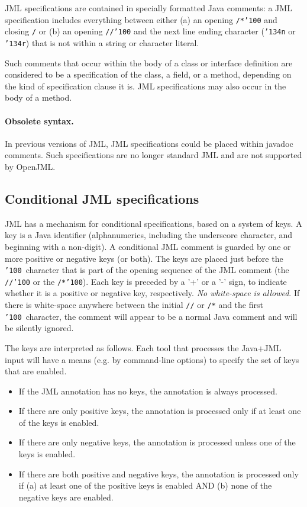 \documentclass{report}%
\newcommand{\bs}{{\tt \char'134}}
\newcommand{\at}{{\tt \char'100}}
\begin{document}
JML specifications are contained in specially formatted Java comments:
a JML specification includes everything between either (a) an opening {\tt /*\at} and closing {\tt */}
or (b) an opening {\tt //\at} and the next line ending character ({\tt \bs n}
or {\tt \bs r}) that is not within a string or character literal.

Such comments that occur within the body of a class or interface definition are
considered to be a specification of the class, a field, or a method, depending on the
kind of specification clause it is. JML specifications may also occur in the body of 
a method.

\paragraph{Obsolete syntax.} In previous versions of JML, JML specifications could be placed
within javadoc comments. Such specifications are no longer standard JML and are not supported by OpenJML.

\subsection{Conditional JML specifications}

JML has a mechanism for conditional specifications, based on a system of keys.
A key is a Java identifier (alphanumerics, including the underscore character, and beginning with a non-digit).
A conditional JML comment is guarded by one or more positive or negative keys (or both).
The keys are placed just before the \at~character that is part of the opening sequence of the JML comment
(the {\tt //\at} or the {\tt /*\at}). Each key is preceded by a '+' or a '-' sign, to indicate whether it is a positive
or negative key, respectively. {\it No white-space is allowed}. If there is white-space anywhere between the
initial {\tt //} or {\tt /*} and the first \at~character, the comment will appear to be a normal Java comment and will be
silently ignored.

The keys are interpreted as follows. Each tool that processes the Java+JML input will have a means
(e.g. by command-line options) to specify the set of keys that are enabled.
\begin{itemize}
\item If the JML annotation has no keys, the annotation is always processed.
\item If there are only positive keys, the annotation is processed only if at least one of the keys is enabled.
\item If there are only negative keys, the annotation is processed unless one of the keys is enabled.
\item If there are both positive and negative keys, the annotation is processed only if (a) at least one of the
positive keys is enabled AND (b) none of the negative keys are enabled.
\end{itemize}
\end{document}
